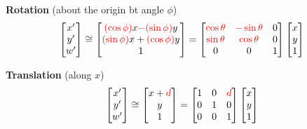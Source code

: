 \begin{listu}
    \item \textbf{Rotation} (about the origin bt angle $\phi$) \[
        \begin{bmatrix}
            x' \\ y' \\ w'
        \end{bmatrix} \cong \begin{bmatrix}
            {\color{red}(\cos \phi)} x {\color{red}- (\sin \phi)} y \\
            {\color{red}(\sin \phi)} x + {\color{red}(\cos \phi)} y \\
            1
        \end{bmatrix} = \begin{bmatrix}
            {\color{red}\cos \theta} & {\color{red}-\sin \theta} & 0 \\
            {\color{red}\sin \theta} & {\color{red}\cos \theta} & 0 \\
            0 & 0 & 1
        \end{bmatrix} \begin{bmatrix}
            x \\ y \\ 1
        \end{bmatrix}
    \]

    \item \textbf{Translation} (along $x$) \[
        \begin{bmatrix}
            x' \\ y' \\ w'
        \end{bmatrix} \cong \begin{bmatrix}
            x + {\color{red} d} \\ y \\ 1
        \end{bmatrix} = \begin{bmatrix}
            1 & 0 & {\color{red} d} \\
            0 & 1 & 0 \\
            0 & 0 & 1
        \end{bmatrix} \begin{bmatrix}
            x \\ y \\ 1
        \end{bmatrix}
    \]


\end{listu}
